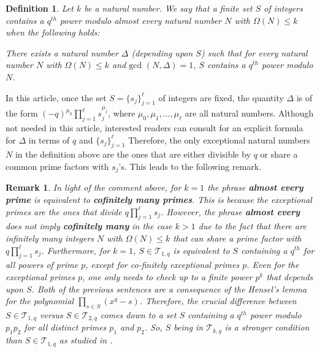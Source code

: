 \documentclass[12pt]{amsart}
\newtheorem{definition}{Definition}
\newtheorem{remark}[theorem]{Remark}
\begin{document}
\begin{definition}
Let $k$ be a natural number. We say that a finite set $S$ of integers contains a $q^{th}$ power modulo almost every natural number $N$ with $\Omega(N) \leq k$ when the following holds:
\begin{center}
There exists a natural number $\Delta$ (depending upon $S$) such that for every natural number $N$ with $\Omega(N) \leq k$ and $\text{gcd }(N, \Delta) = 1$, $S$ contains a $q^{th}$ power modulo $N$. \label{Delta}
\end{center}
\end{definition}


In this article, once the set $S = \{s_{j}\}_{j=1}^{\ell}$ of integers are fixed, the quantity $\Delta$ is of the form $(-q)^{\mu_{0}} \prod_{j=1}^{\ell} s_{j}^{\mu_{j}}$, where $\mu_{0}, \mu_{1}, \ldots, \mu_{\ell}$ are all natural numbers. Although not needed in this article, interested readers can consult \cite[pp. 5]{mishra2022polynomials} for an explicit formula for $\Delta$ in terms of $q$ and $\{s_{j}\}_{j=1}^{\ell}$ Therefore, the only exceptional natural numbers $N$ in the definition above are the ones that are either divisible by $q$ or share a common prime factors with $s_{j}$'s. This leads to the following remark. 

\begin{remark}
In light of the comment above, for $k = 1$ the phrase \textbf{almost every prime} is equivalent to \textbf{cofinitely many primes}. This is because the exceptional primes are the ones that divide $q\prod_{j=1}^{\ell} s_{j}$. However, the phrase \textbf{almost every} does not imply \textbf{cofinitely many} in the case $k > 1$ due to the fact that there are infinitely many integers $N$ with $\Omega(N) \leq k$ that can share a prime factor with $q\prod_{j=1}^{\ell} s_{j}$. 
Furthermore, for $k = 1$, $S \in \mathcal{T}_{1,q}$ is equivalent to $S$ containing a $q^{th}$ for all powers of prime $p$, except for co-finitely exceptional primes $p$. Even for the exceptional primes $p$, one only needs to check up to a finite power $p^{k}$ that depends upon $S$. Both of the previous sentences are a consequence of the Hensel's lemma for the polynomial $\prod_{s \in S} (x^{q} - s)$. Therefore, the crucial difference between $S \in\mathcal{T}_{1,q}$ versus $S \in \mathcal{T}_{2,q}$ comes down to a set $S$ containing a $q^{th}$ power modulo $p_{1}p_{2}$ for all distinct primes $p_{1}$ and $p_{2}$. So, $S$ being in $\mathcal{T}_{k,q}$ is a stronger condition than $S \in \mathcal{T}_{1,q}$ as studied in \cite{SS, skalba2005sets}.
\end{remark}
\end{document}
